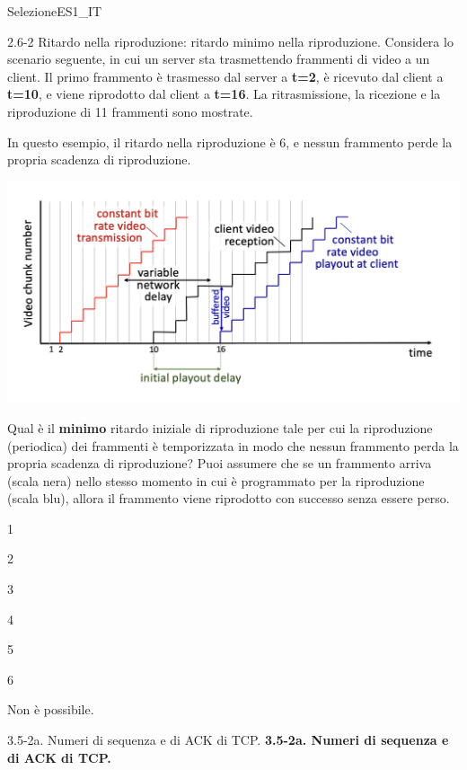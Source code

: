 \documentclass[a4paper]{article}
\begin{document}
\begin{quiz}{SelezioneES1\_IT}
\begin{multi}[points=1,shuffle]{2.6-2 Ritardo nella riproduzione: ritardo minimo nella riproduzione.}
Considera lo scenario seguente, in cui un server sta trasmettendo frammenti di video a un client. Il primo frammento è trasmesso dal server a \textbf{t=2}, è ricevuto dal client a \textbf{t=10}, e viene riprodotto dal client a \textbf{t=16}. La ritrasmissione, la ricezione e la riproduzione di 11 frammenti sono mostrate.

In questo esempio, il ritardo nella riproduzione è 6, e nessun frammento perde la propria scadenza di riproduzione.
\begin{center}
\includegraphics[width=\linewidth]{figs/playout_delay.jpg}
\end{center}

Qual è il \textbf{minimo} ritardo iniziale di riproduzione tale per cui la riproduzione (periodica) dei frammenti è temporizzata in modo che nessun frammento perda la propria scadenza di riproduzione? Puoi assumere che se un frammento arriva (scala nera) nello stesso momento in cui è programmato per la riproduzione (scala blu), allora il frammento viene riprodotto con successo senza essere perso.
\item 1
\item 2
\item 3
\item* 4
\item 5
\item 6
\item Non è possibile.
\end{multi}

\begin{multi}[points=1,shuffle]{3.5-2a. Numeri di sequenza e di ACK di TCP.}
\textbf{3.5-2a. Numeri di sequenza e di ACK di TCP.}


\end{multi}
\end{quiz}
\end{document}
